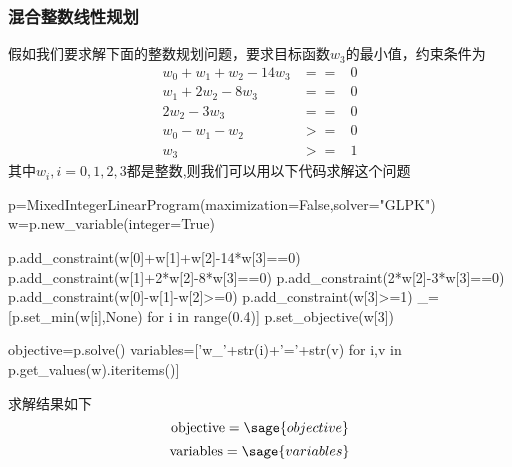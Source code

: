 \subsubsection{混合整数线性规划}
假如我们要求解下面的整数规划问题，要求目标函数$w_3$的最小值，约束条件为
\[
\begin{array}{lcr}
w_0+w_1+w_2-14w_3&==&0\\
w_1+2w_2-8w_3    &==&0\\
2w_2-3w_3         &==&0\\
w_0-w_1-w_2        &>=&0\\
w_3                  &>=&1
\end{array}
\]
其中$w_i,i=0,1,2,3$都是整数,则我们可以用以下代码求解这个问题
\begin{sageblock}
p=MixedIntegerLinearProgram(maximization=False,solver="GLPK")
w=p.new_variable(integer=True)

p.add_constraint(w[0]+w[1]+w[2]-14*w[3]==0)
p.add_constraint(w[1]+2*w[2]-8*w[3]==0)
p.add_constraint(2*w[2]-3*w[3]==0)
p.add_constraint(w[0]-w[1]-w[2]>=0)
p.add_constraint(w[3]>=1)
_=[p.set_min(w[i],None) for i in range(0.4)]
p.set_objective(w[3])

objective=p.solve()
variables=['w_'+str(i)+'='+str(v) for i,v in p.get_values(w).iteritems()]
\end{sageblock}

求解结果如下
\[\textrm{objective}=\sage{objective}\]
\[\textrm{variables}=\sage{variables}\]


